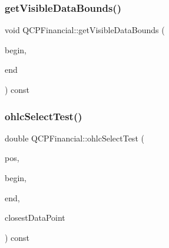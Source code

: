 \subsubsection{\texorpdfstring{getVisibleDataBounds()}{getVisibleDataBounds()}}
{\footnotesize\ttfamily void Q\+C\+P\+Financial\+::get\+Visible\+Data\+Bounds (\begin{DoxyParamCaption}\item[{\mbox{\hyperlink{class_q_c_p_data_container_ae40a91f5cb0bcac61d727427449b7d15}{Q\+C\+P\+Financial\+Data\+Container\+::const\+\_\+iterator}} \&}]{begin,  }\item[{\mbox{\hyperlink{class_q_c_p_data_container_ae40a91f5cb0bcac61d727427449b7d15}{Q\+C\+P\+Financial\+Data\+Container\+::const\+\_\+iterator}} \&}]{end }\end{DoxyParamCaption}) const\hspace{0.3cm}{\ttfamily [protected]}}

\mbox{\label{class_q_c_p_financial_a2bf2228cc443eb5fb11ec3ea3902859c}} 
\subsubsection{\texorpdfstring{ohlcSelectTest()}{ohlcSelectTest()}}
{\footnotesize\ttfamily double Q\+C\+P\+Financial\+::ohlc\+Select\+Test (\begin{DoxyParamCaption}\item[{const Q\+PointF \&}]{pos,  }\item[{const \mbox{\hyperlink{class_q_c_p_data_container_ae40a91f5cb0bcac61d727427449b7d15}{Q\+C\+P\+Financial\+Data\+Container\+::const\+\_\+iterator}} \&}]{begin,  }\item[{const \mbox{\hyperlink{class_q_c_p_data_container_ae40a91f5cb0bcac61d727427449b7d15}{Q\+C\+P\+Financial\+Data\+Container\+::const\+\_\+iterator}} \&}]{end,  }\item[{\mbox{\hyperlink{class_q_c_p_data_container_ae40a91f5cb0bcac61d727427449b7d15}{Q\+C\+P\+Financial\+Data\+Container\+::const\+\_\+iterator}} \&}]{closest\+Data\+Point }\end{DoxyParamCaption}) const\hspace{0.3cm}{\ttfamily [protected]}}

\mbox{\label{class_q_c_p_financial_a25d9a8f256e5ddcba56b6e2e7e968653}} 
